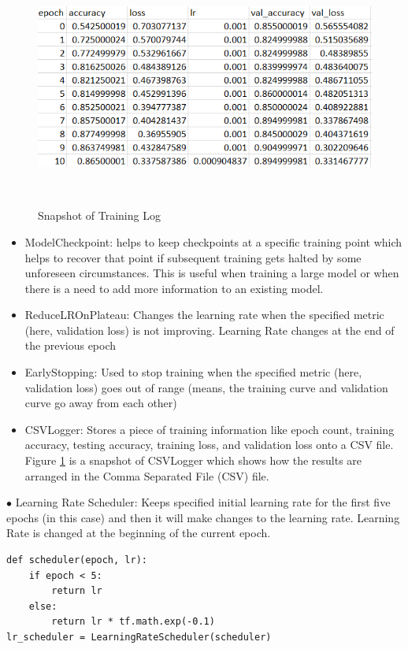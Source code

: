 \begin{figure}[!htbp]
    \centering
    \includegraphics[width=0.6\linewidth]{Images/training_log.png}
    \caption{Snapshot of Training Log}\
    \label{fig:TrainingLog}
\end{figure}

\clearpage

\begin{itemize}
    \item ModelCheckpoint: helps to keep checkpoints at a specific training point which helps to recover that point if subsequent training gets halted by some unforeseen circumstances. This is useful when training a large model or when there is a need to add more information to an existing model.

    \item ReduceLROnPlateau: Changes the learning rate when the specified metric (here, validation loss) is not improving. Learning Rate changes at the end of the previous epoch

    \item EarlyStopping: Used to stop training when the specified metric (here, validation loss) goes out of range (means, the training curve and validation curve go away from each other)

    \item CSVLogger: Stores a piece of training information like epoch count, training accuracy, testing accuracy, training loss, and validation loss onto a CSV file. Figure \ref{fig:TrainingLog} is a snapshot of CSVLogger which shows how the results are arranged in the Comma Separated File (CSV) file.    
\end{itemize}




\noindent $\bullet$ Learning Rate Scheduler: Keeps specified initial learning rate for the first five epochs (in this case) and then it will make changes to the learning rate. Learning Rate is changed at the beginning of the current epoch.

\begin{lstlisting}
def scheduler(epoch, lr):
    if epoch < 5:
        return lr
    else:
        return lr * tf.math.exp(-0.1)
lr_scheduler = LearningRateScheduler(scheduler)
\end{lstlisting}

